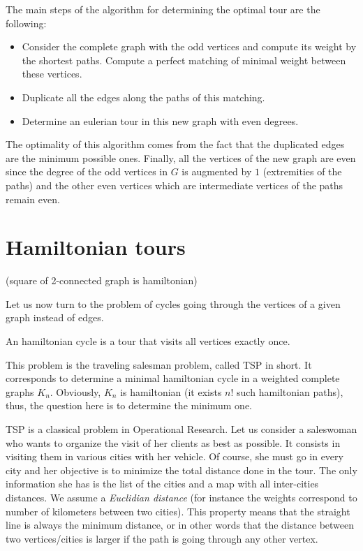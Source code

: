 The main steps of the algorithm for determining the optimal tour are the following:

\begin{itemize}
\item Consider the complete graph with the odd vertices and compute its weight by the shortest paths.
Compute a perfect matching of minimal weight between these vertices. 
\item Duplicate all the edges along the paths of this matching.
\item Determine an eulerian tour in this new graph with even degrees.
\end{itemize}

The optimality of this algorithm comes from the fact that the duplicated edges are the minimum possible ones.
Finally, all the vertices of the new graph are even since the degree of the odd vertices in $G$ is augmented by $1$
(extremities of the paths) and the other even vertices which are intermediate vertices of the paths remain even. 



\section{Hamiltonian tours}

\cite{Fleischner74}
(square of 2-connected graph is hamiltonian)

Let us now turn to the problem of cycles going through the vertices of a given graph instead of edges.
\bigskip

An hamiltonian cycle is a tour that visits all vertices exactly once.

This problem is the traveling salesman problem, called TSP in short.
It corresponds to determine a minimal hamiltonian cycle in a weighted complete graphs $K_n$.
Obviously, $K_n$ is hamiltonian (it exists $n!$ such hamiltonian paths), thus, the question here is to determine the minimum one. 

TSP is a classical problem in Operational Research.
Let us consider a saleswoman who wants to organize the visit of her clients as best as possible.
It consists in visiting them in various cities with her vehicle. 
Of course, she must go in every city and her objective is to minimize the total distance done in the tour. 
The only information she has is the list of the cities and a map with all inter-cities distances. 
We assume a \textit{Euclidian distance} (for instance the weights correspond to number of kilometers between two cities).
This property means that the straight line is always the minimum distance, or in other words that the distance between two vertices/cities
is larger if the path is going through any other vertex. 
\bigskip

